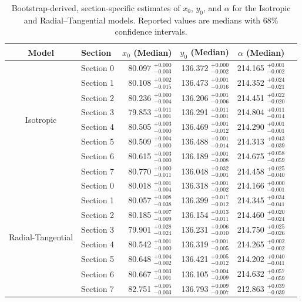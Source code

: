 \documentclass[11pt]{article}
\begin{document}
\begin{table}[ht]
\centering
\caption{Bootstrap-derived, section-specific estimates of $x_0$, $y_0$, and $\alpha$ for the Isotropic and Radial–Tangential models. Reported values are medians with 68\% confidence intervals.}
\small
\begin{tabular}{clrrrr}
\toprule
Model & Section & \multicolumn{1}{c}{$x_0$ (Median)} & \multicolumn{1}{c}{$y_0$ (Median)} & \multicolumn{1}{c}{$\alpha$ (Median)} \\
\midrule
\multirow{8}{*}{Isotropic}
& Section 0 & 80.097 $^{+0.000}_{-0.003}$ & 136.372 $^{+0.000}_{-0.002}$ & 214.165 $^{+0.001}_{-0.002}$ \\
& Section 1 & 80.108 $^{+0.002}_{-0.015}$ & 136.473 $^{+0.001}_{-0.016}$ & 214.352 $^{+0.024}_{-0.021}$ \\
& Section 2 & 80.236 $^{+0.000}_{-0.004}$ & 136.206 $^{+0.001}_{-0.006}$ & 214.451 $^{+0.022}_{-0.020}$ \\
& Section 3 & 79.853 $^{+0.011}_{-0.001}$ & 136.291 $^{+0.011}_{-0.001}$ & 214.804 $^{+0.011}_{-0.014}$ \\
& Section 4 & 80.505 $^{+0.003}_{-0.000}$ & 136.469 $^{+0.001}_{-0.012}$ & 214.290 $^{+0.001}_{-0.001}$ \\
& Section 5 & 80.509 $^{+0.004}_{-0.000}$ & 136.488 $^{+0.001}_{-0.014}$ & 214.313 $^{+0.043}_{-0.039}$ \\
& Section 6 & 80.615 $^{+0.003}_{-0.000}$ & 136.189 $^{+0.001}_{-0.008}$ & 214.675 $^{+0.058}_{-0.059}$ \\
& Section 7 & 80.770 $^{+0.000}_{-0.011}$ & 136.048 $^{+0.032}_{-0.001}$ & 214.458 $^{+0.025}_{-0.040}$ \\
\midrule
\multirow{8}{*}{Radial-Tangential}
& Section 0 & 80.018 $^{+0.001}_{-0.004}$ & 136.318 $^{+0.001}_{-0.002}$ & 214.166 $^{+0.000}_{-0.001}$ \\
& Section 1 & 80.057 $^{+0.008}_{-0.038}$ & 136.399 $^{+0.017}_{-0.012}$ & 214.345 $^{+0.034}_{-0.041}$ \\
& Section 2 & 80.185 $^{+0.007}_{-0.009}$ & 136.154 $^{+0.013}_{-0.011}$ & 214.460 $^{+0.020}_{-0.024}$ \\
& Section 3 & 79.901 $^{+0.028}_{-0.024}$ & 136.231 $^{+0.006}_{-0.010}$ & 214.750 $^{+0.025}_{-0.026}$ \\
& Section 4 & 80.542 $^{+0.001}_{-0.000}$ & 136.319 $^{+0.001}_{-0.005}$ & 214.265 $^{+0.002}_{-0.002}$ \\
& Section 5 & 80.648 $^{+0.004}_{-0.002}$ & 136.421 $^{+0.005}_{-0.012}$ & 214.202 $^{+0.040}_{-0.041}$ \\
& Section 6 & 80.667 $^{+0.003}_{-0.001}$ & 136.105 $^{+0.004}_{-0.009}$ & 214.632 $^{+0.057}_{-0.059}$ \\
& Section 7 & 82.751 $^{+0.005}_{-0.003}$ & 136.793 $^{+0.009}_{-0.007}$ & 212.863 $^{+0.039}_{-0.039}$ \\
\bottomrule
\end{tabular}
\label{tab:bs-2}
\end{table}
\end{document}
